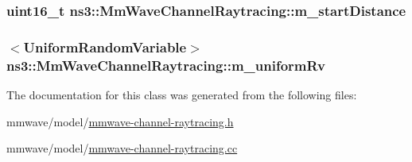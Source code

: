 \subsubsection[{\texorpdfstring{m\+\_\+start\+Distance}{m_startDistance}}]{\setlength{\rightskip}{0pt plus 5cm}uint16\+\_\+t ns3\+::\+Mm\+Wave\+Channel\+Raytracing\+::m\+\_\+start\+Distance\hspace{0.3cm}{\ttfamily [private]}}\hypertarget{classns3_1_1MmWaveChannelRaytracing_a796e2c26275e231a09c4049cf8af289d}{}\label{classns3_1_1MmWaveChannelRaytracing_a796e2c26275e231a09c4049cf8af289d}
\subsubsection[{\texorpdfstring{m\+\_\+uniform\+Rv}{m_uniformRv}}]{$<${\bf Uniform\+Random\+Variable}$>$ ns3\+::\+Mm\+Wave\+Channel\+Raytracing\+::m\+\_\+uniform\+Rv\hspace{0.3cm}{\ttfamily [private]}}\hypertarget{classns3_1_1MmWaveChannelRaytracing_a13ab4f0642dccc8758a20e0418cd7b16}{}\label{classns3_1_1MmWaveChannelRaytracing_a13ab4f0642dccc8758a20e0418cd7b16}


The documentation for this class was generated from the following files\+:\begin{DoxyCompactItemize}
\item 
mmwave/model/\hyperlink{mmwave-channel-raytracing_8h}{mmwave-\/channel-\/raytracing.\+h}\item 
mmwave/model/\hyperlink{mmwave-channel-raytracing_8cc}{mmwave-\/channel-\/raytracing.\+cc}\end{DoxyCompactItemize}
